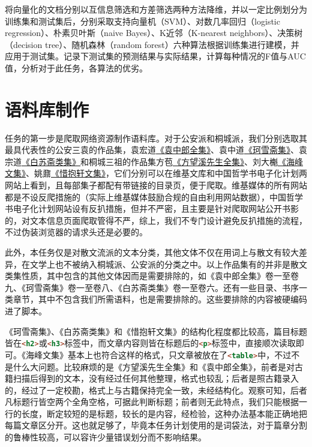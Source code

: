 \documentclass[12pt, a4paper, oneside]{ctexart}
\begin{document}
将向量化的文档分别以互信息筛选和方差筛选两种方法降维，并以一定比例划分为训练集和测试集后，分别采取支持向量机（SVM）、对数几率回归（logistic regression）、朴素贝叶斯（naive Bayes）、K近邻（K-nearest neighbors）、决策树（decision tree）、随机森林（random forest）六种算法根据训练集进行建模，并应用于测试集。记录下测试集的预测结果与实际结果，计算每种情况的F值与AUC值，分析对于此任务，各算法的优劣。

\section{语料库制作}

任务的第一步是爬取网络资源制作语料库。对于公安派和桐城派，我们分别选取其最具代表性的公安三袁的作品集，袁宏道\href{https://ctext.org/wiki.pl?if=gb&res=142162&remap=gb}{《袁中郎全集》}、袁中道\href{https://zh.wikisource.org/wiki/珂雪齋集}{《珂雪斋集》}、袁宗道\href{https://zh.wikisource.org/zh-hant/白蘇齋類集}{《白苏斋类集》}和桐城三祖的作品集方苞\href{https://zh.wikisource.org/wiki/方望溪先生全集_(四部叢刊本)}{《方望溪先生全集》}、刘大櫆\href{https://ctext.org/wiki.pl?if=gb&res=110875}{《海峰文集》}、姚鼐\href{https://zh.wikisource.org/wiki/惜抱軒文集}{《惜抱轩文集》}，它们分别可以在维基文库和中国哲学书电子化计划两网站上看到，且每部集子都配有带链接的目录页，便于爬取。维基媒体的所有网站都是不设反爬措施的（实际上维基媒体鼓励合规的自由利用网站数据），中国哲学书电子化计划网站设有反扒措施，但并不严密，且主要是针对爬取网站公开书影的，对文本信息页面爬取管得不严，综上，我们不专门设计避免反扒措施的流程，不过伪装浏览器的请求头还是必要的。

此外，本任务仅是对散文流派的文本分类，其他文体不仅在用词上与散文有较大差异，在文学上也不被纳入桐城派、公安派的分类之中。以上作品集有的并非是散文类集性质，其中包含的其他文体因而是需要排除的，如《袁中郎全集》卷一至卷九、《珂雪斋集》卷一至卷八、《白苏斋类集》卷一至卷六。还有一些目录、书序一类章节，其中不包含我们所需语料，也是需要排除的。这些要排除的内容被硬编码进了脚本。

《珂雪斋集》、《白苏斋类集》和《惜抱轩文集》的结构化程度都比较高，篇目标题皆在\lstinline[language=html]!<h2>!或\lstinline[language=html]!<h3>!标签中，而文章内容则皆在标题后的\lstinline[language=html]!<p>!标签中，直接顺次读取即可。《海峰文集》基本上也符合这样的格式，只文章被放在了\lstinline[language=html]!<table>!中，不过不是什么大问题。比较麻烦的是《方望溪先生全集》和《袁中郎全集》，前者是对古籍扫描后得到的文本，没有经过任何其他整理，格式也较乱；后者是照古籍录入的，经过了一定校勘，格式上与古籍保持完全一致，未经结构化。观察可知，后者凡标题行皆空两个全角空格，可据此判断标题；前者则无此特点，我们只能根据一行的长度，断定较短的是标题，较长的是内容，经检验，这种办法基本能正确地把每篇文章区分开。这也就足够了，毕竟本任务计划使用的是词袋法，对于篇章分割的鲁棒性较高，可以容许少量错误划分而不影响结果。
\end{document}
